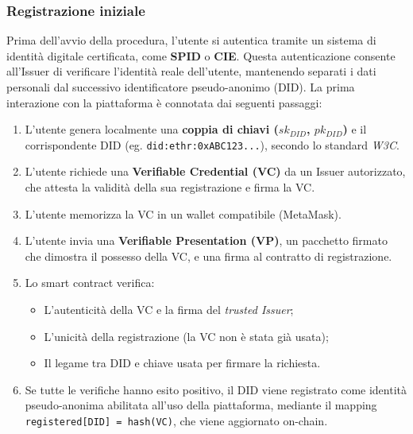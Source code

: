             \subsubsection{Registrazione iniziale}
                \noindent Prima dell'avvio della procedura, l'utente si autentica tramite un sistema di identità digitale certificata, come \textbf{SPID} o \textbf{CIE}. Questa autenticazione consente all'Issuer di verificare l'identità reale dell'utente, mantenendo separati i dati personali dal successivo identificatore pseudo-anonimo (DID).
                La prima interazione con la piattaforma è connotata dai seguenti passaggi:
                    \begin{enumerate}
                        \item L'utente genera localmente una \textbf{coppia di chiavi ($sk_{DID}$, $pk_{DID}$)} e il corrispondente DID (eg. \texttt{did:ethr:0xABC123...}), secondo lo standard \textit{W3C}.
                        
                        \item L'utente richiede una \textbf{Verifiable Credential (VC)} da un Issuer autorizzato, che attesta la validità della sua registrazione e firma la VC.

                        \item L'utente memorizza la VC in un wallet compatibile (MetaMask).
                    
                        \item L'utente invia una \textbf{Verifiable Presentation (VP)}, un pacchetto firmato che dimostra il possesso della VC, e una firma al contratto di registrazione.
                        
                        \item Lo smart contract verifica:
                            \begin{itemize}
                                \item L'autenticità della VC e la firma del \textit{trusted Issuer};
                                
                                \item L'unicità della registrazione (la VC non è stata già usata);
                                
                                \item Il legame tra DID e chiave usata per firmare la richiesta.
                            \end{itemize}
                    
                        \item Se tutte le verifiche hanno esito positivo, il DID viene registrato come identità pseudo-anonima abilitata all'uso della piattaforma, mediante il mapping \texttt{registered[DID] = hash(VC)}, che viene aggiornato on-chain.
                    \end{enumerate}
            
